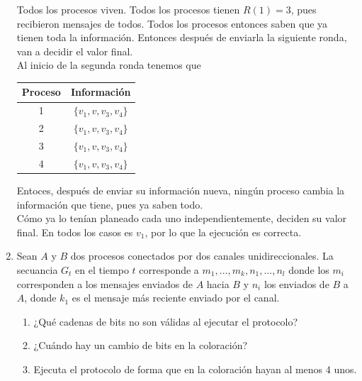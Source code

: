\documentclass[12pt,a4paper]{report}
\begin{document}
\begin{enumerate}
{\begin{enumerate} [label = \alph*)]
{				Todos los procesos viven. Todos los procesos tienen $R(1) = 3$, pues
				recibieron mensajes de todos. Todos los procesos entonces saben que
				ya tienen toda la información. Entonces después de enviarla la siguiente
				ronda, van a decidir el valor final.\\

				Al inicio de la segunda ronda tenemos que

				\begin{center}
					\begin{tabular}{|c|c|}
						\hline
						Proceso & Información\\
						\hline
						1 & $\{v_1, v, v_3, v_4\}$\\
						\hline
						2 & $\{v_1, v, v_3, v_4\}$\\
						\hline
						3 & $\{v_1, v, v_3, v_4\}$\\
						\hline
						4 & $\{v_1, v, v_3, v_4\}$\\
						\hline
					\end{tabular}
				\end{center}
				Entoces, después de enviar su información nueva, ningún proceso cambia
				la información que tiene, pues ya saben todo.\\
				Cómo ya lo tenían planeado cada uno independientemente, deciden su valor
				final. En todos los casos es $v_1$, por lo que la ejecución es correcta.\\
			}
		\end{enumerate}

	}




	\item {
		Sean $A$ y $B$ dos procesos conectados por dos canales unidireccionales.
		La secuancia $G_t$ en el tiempo $t$ corresponde a $m_1, ..., m_k, n_1, ..., n_l$
		donde los $m_i$ corresponden a los mensajes enviados de $A$ hacia $B$ y $n_i$
		los enviados de $B$ a $A$, donde $k_1$ es el mensaje más reciente enviado
		por el canal.

		\begin{enumerate} [label = \alph*]
			\item {
				¿Qué cadenas de bits no son válidas al ejecutar el protocolo?
			}
			\item{
				¿Cuándo hay un cambio de bits en la coloración?
			}
			\item{
				Ejecuta el protocolo de forma que en la coloración hayan al menos 4 unos.
			}
		\end{enumerate}

}
\end{enumerate}
\end{document}
